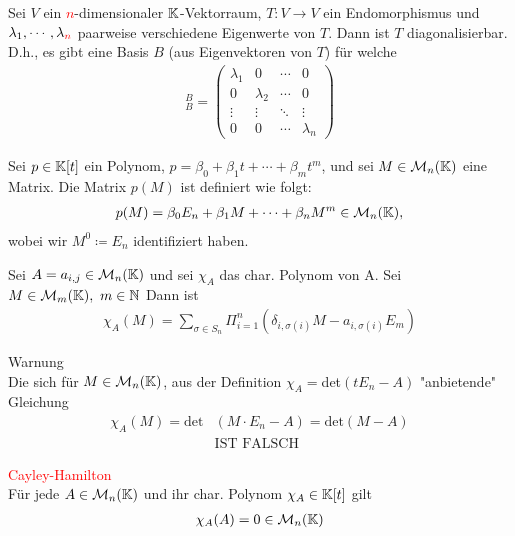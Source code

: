 \begin{corollary}
Sei $V$ ein \textcolor{red}{$n$}-dimensionaler $\mathbb{K}$-Vektorraum, $T:V\to V$ ein Endomorphismus und $\lambda_1,\dotsb,\lambda_\text{\textcolor{red}{$n$}}$ paarweise verschiedene Eigenwerte von $T$. Dann ist $T$ diagonalisierbar.
D.h., es gibt eine Basis $B$ (aus Eigenvektoren von $T$) für welche 
\begin{align*}
    [T]_B^B= \left( \begin{matrix} \lambda_1 & 0 & \dotsb & 0 \\ 0 & \lambda_2 & \dotsb & 0 \\ \vdots & \vdots & \ddots & \vdots \\ 0 & 0 & \dotsb & \lambda_n \end{matrix} \right)
\end{align*}
\end{corollary}

\begin{definition}
Sei $p\in \mathbb{K}[t]$ ein Polynom, $p=\beta_0+\beta_1t+\dotsb+\beta_mt^m$, und sei $M\in \mathcal{M}_n(\mathbb{K})$ eine Matrix. Die Matrix $p(M)$ ist definiert wie folgt:
\begin{align*}
    p(M) = \beta_0E_n+\beta_1M+\dotsb+\beta_nM^m\in \mathcal{M}_n(\mathbb{K}),
\end{align*}
wobei wir $M^0\coloneqq E_n$ identifiziert haben.
\end{definition}

\begin{remark}
Sei $A=a_{i,j}\in\mathcal{M}_n(\mathbb{K})$ und sei $\chi_A$ das char. Polynom von A. Sei $M\in\mathcal{M}_m(\mathbb{K}),\ m\in\mathbb{N}$ Dann ist 
\begin{align*}
    \chi_A(M)=\sum_{\sigma\in S_n}\Pi_{i=1}^n(\delta_{i,\sigma(i)}M-a_{i,\sigma(i)}E_m)
\end{align*}
\end{remark}

\begin{remark}
Warnung\\
Die sich für $M\in\mathcal{M}_n(\mathbb{K})$, aus der Definition $\chi_A=$det$(tE_n-A)$ "anbietende" Gleichung
\begin{align*}
    \chi_A(M)=\text{det}&(M\cdot E_n-A)=\text{det}(M-A)\\
    &\text{IST FALSCH}
\end{align*}
\end{remark}

\begin{theorem}
\textcolor{red}{Cayley-Hamilton}\\
Für jede $A\in\mathcal{M}_n(\mathbb{K})$ und ihr char. Polynom $\chi_A\in\mathbb{K}[t]$ gilt
\begin{align*}
    \chi_A(A)=0\in\mathcal{M}_n(\mathbb{K})
\end{align*}
\end{theorem}

